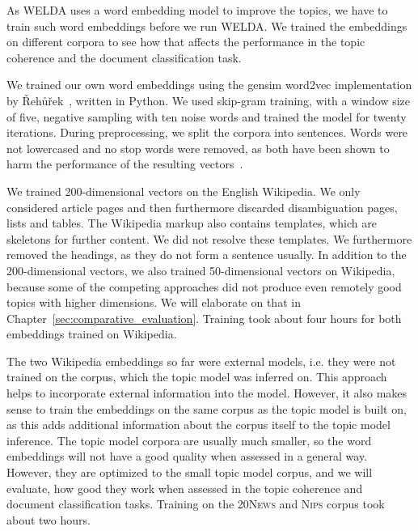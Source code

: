 \documentclass[
        a4paper,
        titlepage,
        twoside,
        parskip,
        numbers=noenddot
        ]{scrbook}
\theoremstyle{break}
\begin{document}
As WELDA uses a word embedding model to improve the topics, we have to train such word embeddings before we run WELDA.
We trained the embeddings on different corpora to see how that affects the performance in the topic coherence and the document classification task.

We trained our own word embeddings using the gensim word2vec implementation by {\v R}eh{\r u}{\v r}ek~\cite{Rehurek2010}, written in Python.
We used skip-gram training, with a window size of five, negative sampling with ten noise words and trained the model for twenty iterations.
During preprocessing, we split the corpora into sentences.
Words were not lowercased and no stop words were removed, as both have been shown to harm the performance of the resulting vectors~\cite{Mikolov2013d}.

We trained 200-dimensional vectors on the English Wikipedia.
We only considered article pages and then furthermore discarded disambiguation pages, lists and tables.
The Wikipedia markup also contains templates, which are skeletons for further content.
We did not resolve these templates.
We furthermore removed the headings, as they do not form a sentence usually.
In addition to the 200-dimensional vectors, we also trained 50-dimensional vectors on Wikipedia, because some of the competing approaches did not produce even remotely good topics with higher dimensions.
We will elaborate on that in Chapter~\ref{sec:comparative_evaluation}.
Training took about four hours for both embeddings trained on Wikipedia.

The two Wikipedia embeddings so far were external models, i.e. they were not trained on the corpus, which the topic model was inferred on.
This approach helps to incorporate external information into the model.
However, it also makes sense to train the embeddings on the same corpus as the topic model is built on, as this adds additional information about the corpus itself to the topic model inference.
The topic model corpora are usually much smaller, so the word embeddings will not have a good quality when assessed in a general way.
However, they are optimized to the small topic model corpus, and we will evaluate, how good they work when assessed in the topic coherence and document classification tasks.
Training on the \textsc{20News} and \textsc{Nips} corpus took about two hours.
\end{document}
